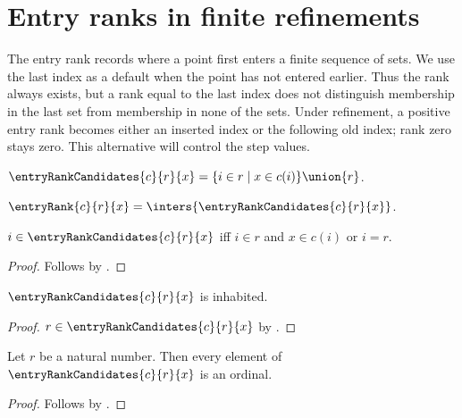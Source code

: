 \section{Entry ranks in finite refinements}



The entry rank records where a point first enters a finite sequence of sets.
We use the last index as a default when the point has not entered earlier.
Thus the rank always exists, but a rank equal to the last index does not
distinguish membership in the last set from membership in none of the sets.
Under refinement, a positive entry rank becomes either an inserted index or
the following old index; rank zero stays zero. This alternative will control
the step values.

\begin{definition}\label{entry_rank_candidates}
    $\entryRankCandidates{c}{r}{x}
        =\{i\in r\mid x\in c(i)\}\union\{r\}$.
\end{definition}

\begin{definition}\label{entry_rank}
    $\entryRank{c}{r}{x}
        =\inters{\entryRankCandidates{c}{r}{x}}$.
\end{definition}

\begin{proposition}\label{entry_rank_candidates_iff}
    $i\in\entryRankCandidates{c}{r}{x}$ iff
        $i\in r$ and $x\in c(i)$ or $i=r$.
\end{proposition}
\begin{proof}
    Follows by .
\end{proof}

\begin{proposition}\label{entry_rank_candidates_inhabited}
    $\entryRankCandidates{c}{r}{x}$ is inhabited.
\end{proposition}
\begin{proof}
    $r\in\entryRankCandidates{c}{r}{x}$
        by .
\end{proof}

\begin{proposition}\label{entry_rank_candidates_are_ordinals}
    Let $r$ be a natural number.
    Then every element of $\entryRankCandidates{c}{r}{x}$ is an ordinal.
\end{proposition}
\begin{proof}
    Follows by
        .
\end{proof}

